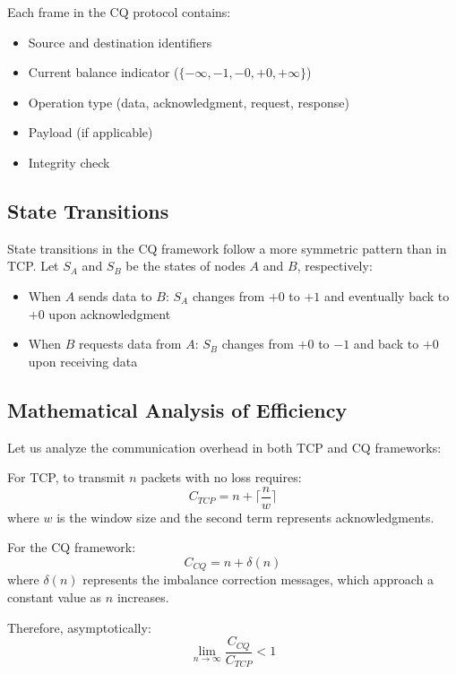 \documentclass[../../../OAE-SPEC-MAIN.tex]{subfiles}
\begin{document}
Each frame in the CQ protocol contains:

\begin{itemize}
    \item Source and destination identifiers
    \item Current balance indicator ($\{-\infty, -1, -0, +0, +\infty\}$)
    \item Operation type (data, acknowledgment, request, response)
    \item Payload (if applicable)
    \item Integrity check
\end{itemize}

\subsection{State Transitions}

State transitions in the CQ framework follow a more symmetric pattern than in TCP. Let $S_A$ and $S_B$ be the states of nodes $A$ and $B$, respectively:

\begin{itemize}
    \item When $A$ sends data to $B$: $S_A$ changes from $+0$ to $+1$ and eventually back to $+0$ upon acknowledgment
    \item When $B$ requests data from $A$: $S_B$ changes from $+0$ to $-1$ and back to $+0$ upon receiving data
\end{itemize}

\subsection{Mathematical Analysis of Efficiency}

Let us analyze the communication overhead in both TCP and CQ frameworks:

For TCP, to transmit $n$ packets with no loss requires:
\begin{equation}
C_{TCP} = n + \lceil \frac{n}{w} \rceil
\end{equation}
where $w$ is the window size and the second term represents acknowledgments.

For the CQ framework:
\begin{equation}
C_{CQ} = n + \delta(n)
\end{equation}
where $\delta(n)$ represents the imbalance correction messages, which approach a constant value as $n$ increases.

Therefore, asymptotically:
\begin{equation}
\lim_{n\to\infty} \frac{C_{CQ}}{C_{TCP}} < 1
\end{equation}
\end{document}
